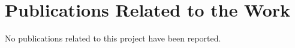 \chapter{Publications Related to the Work}
No publications related to this project have been reported.
